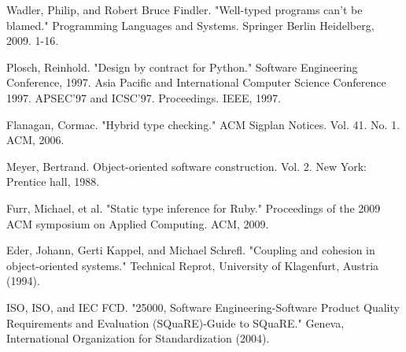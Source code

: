 \documentclass[preprint]{sigplanconf}
\begin{document}
\begin{thebibliography}{}
Wadler, Philip, and Robert Bruce Findler. "Well-typed programs can’t be blamed." Programming Languages and Systems. Springer Berlin Heidelberg, 2009. 1-16.

Plosch, Reinhold. "Design by contract for Python." Software Engineering Conference, 1997. Asia Pacific and International Computer Science Conference 1997. APSEC'97 and ICSC'97. Proceedings. IEEE, 1997.

Flanagan, Cormac. "Hybrid type checking." ACM Sigplan Notices. Vol. 41. No. 1. ACM, 2006.

Meyer, Bertrand. Object-oriented software construction. Vol. 2. New York: Prentice hall, 1988.

Furr, Michael, et al. "Static type inference for Ruby." Proceedings of the 2009 ACM symposium on Applied Computing. ACM, 2009.


Eder, Johann, Gerti Kappel, and Michael Schrefl. "Coupling and cohesion in object-oriented systems." Technical Reprot, University of Klagenfurt, Austria (1994).

ISO, ISO, and IEC FCD. "25000, Software Engineering-Software Product Quality Requirements and Evaluation (SQuaRE)-Guide to SQuaRE." Geneva, International Organization for Standardization (2004).

\end{thebibliography}
\end{document}
